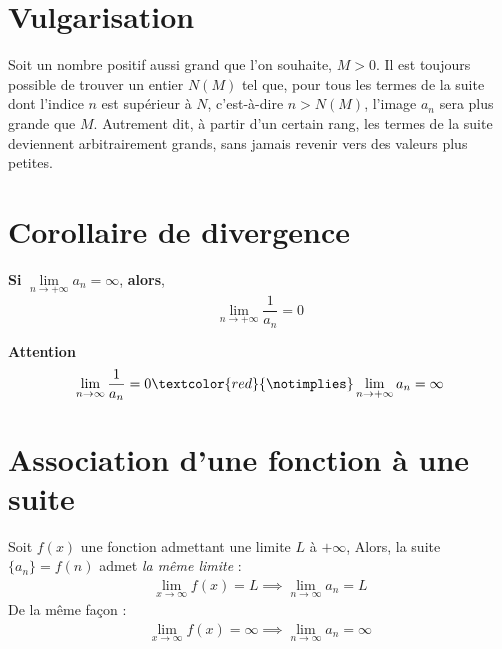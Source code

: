 \documentclass{report}
\begin{document}
\begin{multicols*}{3}
    \section{Vulgarisation}
    Soit un nombre positif aussi grand que l'on souhaite, \(M > 0\). Il est toujours possible 
    de trouver un entier \(N(M)\) tel que, pour tous les termes de la suite dont 
    l'indice \(n\) est supérieur à \(N\), c'est-à-dire \(n > N(M)\), l'image \(a_n\) 
    sera plus grande que \(M\). Autrement dit, à partir d'un certain rang, 
    les termes de la suite deviennent arbitrairement grands, sans jamais 
    revenir vers des valeurs plus petites.

    \section{Corollaire de divergence}
    \textbf{Si} $\lim\limits_{n\to+\infty }a_n  = \infty$,  
    \textbf{alors}, 
    \[ \lim\limits_{n\to+\infty }{\dfrac{1}{a_n}}  = 0 \]

    \textcolor{myr}{\textbf{Attention}} 
        \begin{align*}
            \lim\limits_{n\to\infty  }\frac{1}{a_n} = 0 
            \textcolor{red}{\notimplies}
            \lim\limits_{n\to+\infty }a_n  = \infty
        \end{align*}  


    \section{Association d'une fonction à une suite}
        Soit $f\left(x\right)$ une fonction admettant une limite $L$ à 
        $\text{+}\infty$, Alors, la suite 
        $\{a_n\} = f\left(n\right)$ admet \textit{la même limite} : 
        \begin{align*}
          \lim\limits_{x\to\infty  }f(x) = L \implies \lim\limits_{n\to\infty  }a_n = L
        \end{align*}
        De la même façon :
        \begin{align*}
          \lim\limits_{x\to\infty  }f(x) = \infty \implies \lim\limits_{n\to\infty  }a_n = \infty
        \end{align*}


        \begin{center}
\end{center}
\end{multicols*}
\end{document}
